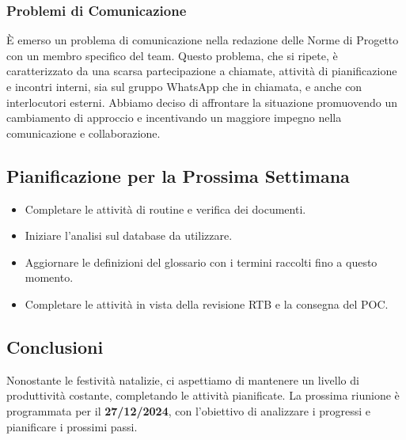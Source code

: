 \documentclass{article}
\newcommand{\isEsterno}{1}
\begin{document}
\subsubsection{Problemi di Comunicazione}
È emerso un problema di comunicazione nella redazione delle Norme di Progetto con un membro specifico del team. Questo problema, che si ripete, è caratterizzato da una scarsa partecipazione a chiamate, attività di pianificazione e incontri interni, sia sul gruppo WhatsApp che in chiamata, e anche con interlocutori esterni.  
Abbiamo deciso di affrontare la situazione promuovendo un cambiamento di approccio e incentivando un maggiore impegno nella comunicazione e collaborazione.

\subsection{Pianificazione per la Prossima Settimana}
\begin{itemize}
    \item Completare le attività di routine e verifica dei documenti.
    \item Iniziare l'analisi sul database da utilizzare.
    \item Aggiornare le definizioni del glossario con i termini raccolti fino a questo momento.
    \item Completare le attività in vista della revisione RTB e la consegna del POC.
\end{itemize}

\subsection{Conclusioni}
Nonostante le festività natalizie, ci aspettiamo di mantenere un livello di produttività costante, completando le attività pianificate. La prossima riunione è programmata per il \textbf{27/12/2024}, con l'obiettivo di analizzare i progressi e pianificare i prossimi passi.





\ifthenelse{\equal{\isEsterno}{1}}{
    \begin{table}[b]
        \begin{tabular}{@{}p{.5in}p{4in}@{}}
            Data:  & \hrulefill \\
                   &     		\\
                   &     		\\
            Firma: & \hrulefill \\
        \end{tabular}
        \end{table}
}{}
\end{document}
